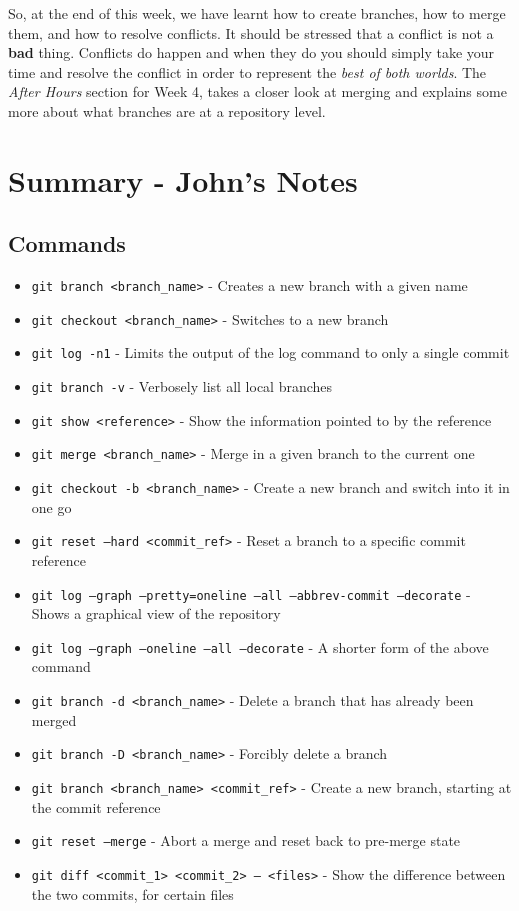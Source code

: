 So, at the end of this week, we have learnt how to create branches, how to merge them, and how to resolve conflicts.
It should be stressed that a conflict is not a \textbf{bad} thing.
Conflicts do happen and when they do you should simply take your time and resolve the conflict in order to represent the \emph{best of both worlds}.
The \emph{After Hours} section for Week 4, takes a closer look at merging and explains some more about what branches are at a repository level.

\clearpage
\section{Summary - John's Notes}
\subsection{Commands}
\begin{itemize}
\item\texttt{git branch <branch\_name>} - Creates a new branch with a given name
\item\texttt{git checkout <branch\_name>} - Switches to a new branch
\item\texttt{git log -n1} - Limits the output of the log command to only a single commit
\item\texttt{git branch -v} - Verbosely list all local branches
\item\texttt{git show <reference>} - Show the information pointed to by the reference
\item\texttt{git merge <branch\_name>} - Merge in a given branch to the current one
\item\texttt{git checkout -b <branch\_name>} - Create a new branch and switch into it in one go
\item\texttt{git reset --hard <commit\_ref>} - Reset a branch to a specific commit reference
\item\texttt{git log --graph --pretty=oneline --all \newline --abbrev-commit --decorate} - Shows a graphical view of the repository
\item\texttt{git log --graph --oneline --all --decorate} - A shorter form of the above command
\item\texttt{git branch -d <branch\_name>} - Delete a branch that has already been merged
\item\texttt{git branch -D <branch\_name>} - Forcibly delete a branch
\item\texttt{git branch <branch\_name> <commit\_ref>} - Create a new branch, starting at the commit reference
\item\texttt{git reset --merge} - Abort a merge and reset back to pre-merge state
\item\texttt{git diff <commit\_1> <commit\_2> -- <files>} - Show the difference between the two commits, for certain files
\end{itemize}

